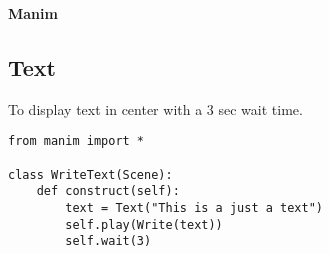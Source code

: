 \documentclass[12pt]{article}
\begin{document}
\begin{center}
    {\LARGE \textbf{Manim} }
\end{center}

\subsection*{Text}
To display text in center with a 3 sec wait time.
\begin{verbatim}
from manim import *

class WriteText(Scene):
    def construct(self):
        text = Text("This is a just a text")
        self.play(Write(text))
        self.wait(3)
  \end{verbatim}
\end{document}
